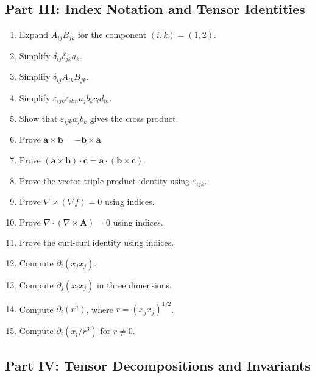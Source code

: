 \documentclass{otscience}
\begin{document}
\subsection{Part III: Index Notation and Tensor Identities}

\begin{practicebox}
\begin{enumerate}
\item Expand \(A_{ij}B_{jk}\) for the component \((i,k)=(1,2)\).
\item Simplify \(\delta_{ij}\delta_{jk}a_k\).
\item Simplify \(\delta_{ij}A_{ik}B_{jk}\).
\item Simplify \(\varepsilon_{ijk}\varepsilon_{ilm}a_{j}b_{k}c_{l}d_m\).
\item Show that \(\varepsilon_{ijk}a_{j}b_k\) gives the cross product.
\item Prove \(\mathbf{a}\times\mathbf{b}=-\mathbf{b}\times\mathbf{a}\).
\item Prove \((\mathbf{a}\times\mathbf{b})\cdot\mathbf{c}=\mathbf{a}\cdot(\mathbf{b}\times\mathbf{c})\).
\item Prove the vector triple product identity using \(\varepsilon_{ijk}\).
\item Prove \(\nabla\times(\nabla f)=0\) using indices.
\item Prove \(\nabla\cdot(\nabla\times\mathbf{A})=0\) using indices.
\item Prove the curl-curl identity using indices.
\item Compute \(\partial_i(x_{j}x_j)\).
\item Compute \(\partial_j(x_{i}x_j)\) in three dimensions.
\item Compute \(\partial_i(r^n)\), where \(r={(x_{j}x_j)}^{1/2}\).
\item Compute \(\partial_i(x_i/r^3)\) for \(r\neq0\).
\end{enumerate}
\end{practicebox}

\subsection{Part IV: Tensor Decompositions and Invariants}
\end{document}
